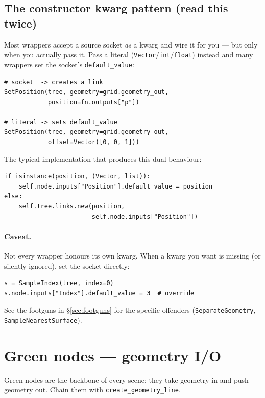 \documentclass[10pt,a4paper,twocolumn]{article}
\newcommand{\code}[1]{\texttt{\small #1}}
\begin{document}
\subsection{The constructor kwarg pattern (read this twice)}

\label{sec:kwargpattern}
Most wrappers accept a source socket \emph{as} a kwarg and wire it for you
--- but only when you actually pass it. Pass a literal
(\code{Vector}/\code{int}/\code{float}) instead and many wrappers set the
socket's \code{default\_value}:

\begin{lstlisting}
# socket  -> creates a link
SetPosition(tree, geometry=grid.geometry_out,
            position=fn.outputs["p"])

# literal -> sets default_value
SetPosition(tree, geometry=grid.geometry_out,
            offset=Vector([0, 0, 1]))
\end{lstlisting}

The typical implementation that produces this dual behaviour:

\begin{lstlisting}
if isinstance(position, (Vector, list)):
    self.node.inputs["Position"].default_value = position
else:
    self.tree.links.new(position,
                        self.node.inputs["Position"])
\end{lstlisting}

\paragraph{Caveat.} Not every wrapper honours its own kwarg. When a kwarg
you want is missing (or silently ignored), set the socket directly:

\begin{lstlisting}
s = SampleIndex(tree, index=0)
s.node.inputs["Index"].default_value = 3  # override
\end{lstlisting}

See the footguns in \S\ref{sec:footguns} for the specific offenders
(\code{SeparateGeometry}, \code{SampleNearestSurface}).

\section{Green nodes --- geometry I/O}
\label{sec:green}

Green nodes are the backbone of every scene: they take geometry in and
push geometry out. Chain them with \code{create\_geometry\_line}.
\end{document}
